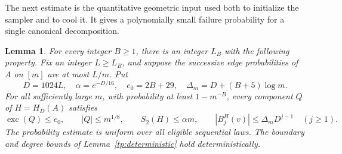 \documentclass[11pt]{article}
\newtheorem{lemma}[thm]{Lemma}
\numberwithin{equation}{section}
\begin{document}
The next estimate is the quantitative geometric input used both to initialize the sampler and to cool it. It gives a polynomially small failure probability for a single canonical decomposition.

\begin{lemma}\label{tp:quantitative}
For every integer $B\ge1$, there is an integer $L_B$ with the following property. Fix an integer $L\ge L_B$, and suppose the successive edge probabilities of $A$ on $[m]$ are at most $L/m$. Put
\[
 D=1024L,\quad \alpha=e^{-D/16},\quad e_0=2B+29,
 \quad \Delta_m=D+(B+5)\log m.
\]
For all sufficiently large $m$, with probability at least $1-m^{-B}$, every component $Q$ of $H=H_D(A)$ satisfies
\[
 \operatorname{exc}(Q)\le e_0,\qquad |Q|\le m^{1/8},
 \qquad S_2(H)\le\alpha m,
 \qquad |B_j^H(v)|\le\Delta_mD^{j-1}\quad(j\ge1).
\]
The probability estimate is uniform over all eligible sequential laws. The boundary and degree bounds of Lemma~\ref{tp:deterministic} hold deterministically.
\end{lemma}
\end{document}
